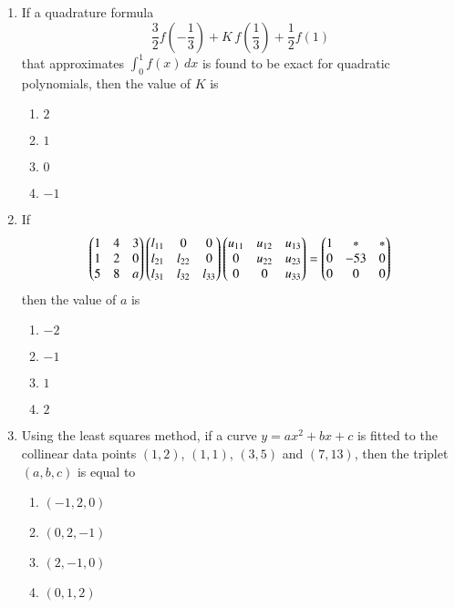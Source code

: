 \documentclass[journal,12pt,onecolumn]{IEEEtran}
\theoremstyle{remark}
\begin{document}
\begin{enumerate}
\item If a quadrature formula  
\[
\frac{3}{2} f\!\left( -\frac{1}{3} \right) + K\,f\!\left( \frac{1}{3} \right) + \frac{1}{2} f(1)
\]
that approximates $\int_0^1 f(x)\, dx$ is found to be exact for quadratic polynomials, then the value of $K$ is  
\\[-0.3em]\makebox[\textwidth][r]{\textit{[GATE EE 2025]}}

\begin{multicols}{2}
\begin{enumerate}[label=(\Alph*)]
\item $2$
\item $1$
\item $0$
\item $-1$
\end{enumerate}
\end{multicols}

\item If  
\[
\begin{pmatrix}
1 & 4 & 3 \\
1 & 2 & 0 \\
5 & 8 & a
\end{pmatrix}
\begin{pmatrix}
l_{11} & 0 & 0 \\
l_{21} & l_{22} & 0 \\
l_{31} & l_{32} & l_{33}
\end{pmatrix}
\begin{pmatrix}
u_{11} & u_{12} & u_{13} \\
0 & u_{22} & u_{23} \\
0 & 0 & u_{33}
\end{pmatrix}
=
\begin{pmatrix}
1 & * & * \\
0 & -53 & 0 \\
0 & 0 & 0
\end{pmatrix}
\]
then the value of $a$ is  
\\[-0.3em]\makebox[\textwidth][r]{\textit{[GATE EE 2025]}}

\begin{multicols}{2}
\begin{enumerate}[label=(\Alph*)]
\item $-2$
\item $-1$
\item $1$
\item $2$
\end{enumerate}
\end{multicols}

\item Using the least squares method, if a curve $y = ax^2 + bx + c$ is fitted to the collinear data points $(1, 2)$, $(1, 1)$, $(3, 5)$ and $(7, 13)$, then the triplet $(a, b, c)$ is equal to  
\\[-0.3em]\makebox[\textwidth][r]{\textit{[GATE EE 2025]}}

\begin{multicols}{2}
\begin{enumerate}[label=(\Alph*)]
\item $(-1, 2, 0)$
\item $(0, 2, -1)$
\item $(2, -1, 0)$
\item $(0, 1, 2)$
\end{enumerate}
\end{multicols}


\end{enumerate}
\end{document}
